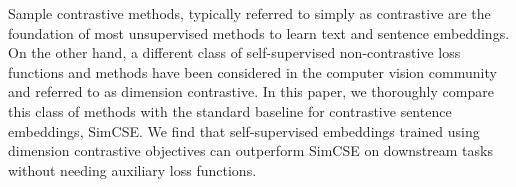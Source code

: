 Sample contrastive methods, typically referred to simply as contrastive are the foundation of most unsupervised methods to learn text and sentence embeddings. On the other hand, a different class of self-supervised non-contrastive loss functions and methods have been considered in the computer vision community and referred to as dimension contrastive. In this paper, we thoroughly compare this class of methods with the standard baseline for contrastive sentence embeddings, SimCSE. We find that self-supervised embeddings trained using dimension contrastive objectives can outperform SimCSE on downstream tasks without needing auxiliary loss functions.